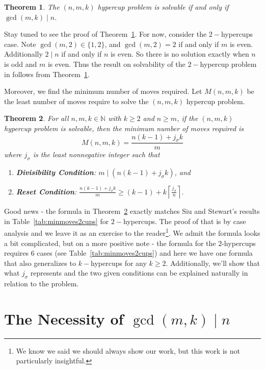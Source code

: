 \documentclass{article}
\theoremstyle{theorem}
\newtheorem{theorem}{Theorem}
\theoremstyle{definition}
\begin{document}
\begin{theorem}\label{thm:bigiff}
    The $(n,m,k)$ hypercup problem is solvable if and only if $\gcd(m,k)\mid n$.
\end{theorem}

Stay tuned to see the proof of Theorem~\ref{thm:bigiff}. For now, consider the $2-$hypercups case. Note $\gcd(m,2)\in\{1,2\}$, and $\gcd(m,2) = 2$ if and only if $m$ is even. Additionally $2\mid n$ if and only if $n$ is even. So there is no solution exactly when $n$ is odd and $m$ is even. Thus the result on solvability of the $2-$hypercup problem in \cite{SS10} follows from Theorem~\ref{thm:bigiff}. 


Moreover, we find the minimum number of moves required. Let $M(n,m,k)$ be the least number of moves require to solve the $(n,m,k)$ hypercup problem. 

\begin{theorem}\label{thm:numberofmoves}
    For all $n,m,k\in\mathbb{N}$ with $k\ge 2$ and $n\ge m$, if the $(n,m,k)$ hypercup problem is solvable, then the minimum number of moves required is
        \[ M(n,m,k) = \frac{n(k-1)+j_\sigma k}{m}\]
    where $j_\sigma$ is the least nonnegative integer such that 
    \begin{enumerate}
        \item \textbf{Divisibility Condition}: $m\mid (n(k-1)+j_\sigma k)$, and
        \item \textbf{Reset Condition}: $\frac{n(k-1)+j_\sigma k}{m}\ge (k-1) + k\left\lceil\frac{j_\sigma}{n}\right\rceil$.
    \end{enumerate} 
\end{theorem}


Good  news - the formula in Theorem~\ref{thm:numberofmoves} exactly matches Siu and Stewart's results in Table~\ref{tab:minmoves2cups} for $2-$hypercups. The proof of that is by case analysis and we leave it as an exercise to the reader\footnote{We know we said we should always show our work, but this work is not particularly insightful.}. We admit the formula looks a bit complicated, but on a more positive note - the formula for the $2$-hypercups requires $6$ cases (see Table~\ref{tab:minmoves2cups}) and here we have one formula that also generalizes to $k-$hypercups for any $k\ge 2$. Additionally, we'll show that what $j_\sigma$ represents and the two given conditions can be explained naturally in relation to the problem. 

\section*{The Necessity of $\gcd(m,k)\mid n$}\label{sec:forward}
\end{document}
